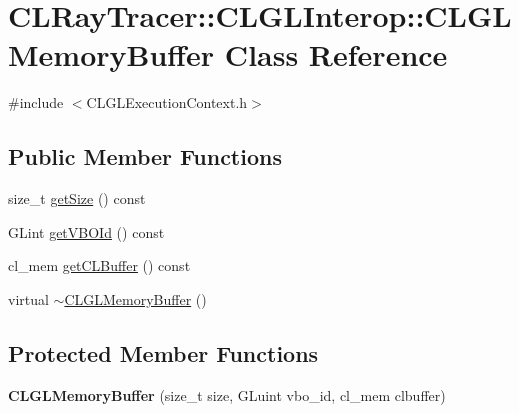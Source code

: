 \hypertarget{class_c_l_ray_tracer_1_1_c_l_g_l_interop_1_1_c_l_g_l_memory_buffer}{}\section{C\+L\+Ray\+Tracer\+:\+:C\+L\+G\+L\+Interop\+:\+:C\+L\+G\+L\+Memory\+Buffer Class Reference}
\label{class_c_l_ray_tracer_1_1_c_l_g_l_interop_1_1_c_l_g_l_memory_buffer}


{\ttfamily \#include $<$C\+L\+G\+L\+Execution\+Context.\+h$>$}

\subsection*{Public Member Functions}
\begin{DoxyCompactItemize}
\item 
size\+\_\+t \hyperlink{class_c_l_ray_tracer_1_1_c_l_g_l_interop_1_1_c_l_g_l_memory_buffer_abf722d7bcc5039959b9e9d78d8fb4c64}{get\+Size} () const 
\item 
G\+Lint \hyperlink{class_c_l_ray_tracer_1_1_c_l_g_l_interop_1_1_c_l_g_l_memory_buffer_a1290eecf62cd3993502fcfab444b5c85}{get\+V\+B\+O\+Id} () const 
\item 
cl\+\_\+mem \hyperlink{class_c_l_ray_tracer_1_1_c_l_g_l_interop_1_1_c_l_g_l_memory_buffer_a510151294f0649cd93534ea76cc7945b}{get\+C\+L\+Buffer} () const 
\item 
virtual \hyperlink{class_c_l_ray_tracer_1_1_c_l_g_l_interop_1_1_c_l_g_l_memory_buffer_a66eee68f74304cc40457c331e2965256}{$\sim$\+C\+L\+G\+L\+Memory\+Buffer} ()
\end{DoxyCompactItemize}
\subsection*{Protected Member Functions}
\begin{DoxyCompactItemize}
\item 
{\bfseries C\+L\+G\+L\+Memory\+Buffer} (size\+\_\+t size, G\+Luint vbo\+\_\+id, cl\+\_\+mem clbuffer)\hypertarget{class_c_l_ray_tracer_1_1_c_l_g_l_interop_1_1_c_l_g_l_memory_buffer_ac066616c6f6f86893b6d8f245389b03f}{}\label{class_c_l_ray_tracer_1_1_c_l_g_l_interop_1_1_c_l_g_l_memory_buffer_ac066616c6f6f86893b6d8f245389b03f}

\end{DoxyCompactItemize}
